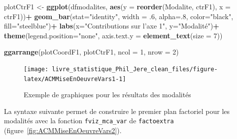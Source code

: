 \documentclass[
  11pt,
  french,
]{book}
\makeatletter
\newenvironment{Shaded}{\begin{snugshade}}{\end{snugshade}}
\newcommand{\CommentTok}[1]{\textcolor[rgb]{0.56,0.35,0.01}{\textit{#1}}}
\newcommand{\DataTypeTok}[1]{\textcolor[rgb]{0.13,0.29,0.53}{#1}}
\newcommand{\DecValTok}[1]{\textcolor[rgb]{0.00,0.00,0.81}{#1}}
\newcommand{\FloatTok}[1]{\textcolor[rgb]{0.00,0.00,0.81}{#1}}
\newcommand{\KeywordTok}[1]{\textcolor[rgb]{0.13,0.29,0.53}{\textbf{#1}}}
\newcommand{\NormalTok}[1]{#1}
\newcommand{\OperatorTok}[1]{\textcolor[rgb]{0.81,0.36,0.00}{\textbf{#1}}}
\newcommand{\OtherTok}[1]{\textcolor[rgb]{0.56,0.35,0.01}{#1}}
\newcommand{\StringTok}[1]{\textcolor[rgb]{0.31,0.60,0.02}{#1}}
\newenvironment{kframe}{%
\medskip{}
\setlength{\fboxsep}{.8em}
 \def\at@end@of@kframe{}%
 \ifinner\ifhmode%
  \def\at@end@of@kframe{\end{minipage}}%
  \begin{minipage}{\columnwidth}%
 \fi\fi%
 \def\FrameCommand##1{\hskip\@totalleftmargin \hskip-\fboxsep
 \colorbox{shadecolor}{##1}\hskip-\fboxsep
     \hskip-\linewidth \hskip-\@totalleftmargin \hskip\columnwidth}%
 \MakeFramed {\advance\hsize-\width
   \@totalleftmargin\z@ \linewidth\hsize
   \@setminipage}}%
 {\par\unskip\endMakeFramed%
 \at@end@of@kframe}
\renewenvironment{Shaded}{\begin{kframe}}{\end{kframe}}
\makeatother
\begin{document}
\begin{Shaded}
\begin{Highlighting}[]
\NormalTok{plotCtrF1 <-}\StringTok{ }\KeywordTok{ggplot}\NormalTok{(dfmodalites, }\KeywordTok{aes}\NormalTok{(}\DataTypeTok{y =} \KeywordTok{reorder}\NormalTok{(Modalite, ctrF1), }\DataTypeTok{x =}\NormalTok{ ctrF1))}\OperatorTok{+}
\StringTok{  }\KeywordTok{geom_bar}\NormalTok{(}\DataTypeTok{stat=}\StringTok{"identity"}\NormalTok{, }\DataTypeTok{width =} \FloatTok{.6}\NormalTok{, }\DataTypeTok{alpha=}\NormalTok{.}\DecValTok{8}\NormalTok{, }\DataTypeTok{color=}\StringTok{"black"}\NormalTok{, }\DataTypeTok{fill=}\StringTok{"steelblue"}\NormalTok{)}\OperatorTok{+}
\StringTok{  }\KeywordTok{labs}\NormalTok{(}\DataTypeTok{x=}\StringTok{"Contributions sur l'axe 1"}\NormalTok{, }\DataTypeTok{y=}\StringTok{"Modalité"}\NormalTok{)}\OperatorTok{+}
\StringTok{  }\KeywordTok{theme}\NormalTok{(}\DataTypeTok{legend.position=}\StringTok{"none"}\NormalTok{, }\DataTypeTok{axis.text.y =} \KeywordTok{element_text}\NormalTok{(}\DataTypeTok{size =} \DecValTok{7}\NormalTok{))}

\KeywordTok{ggarrange}\NormalTok{(plotCoordF1, plotCtrF1, }\DataTypeTok{ncol =} \DecValTok{1}\NormalTok{, }\DataTypeTok{nrow =} \DecValTok{2}\NormalTok{)}
\end{Highlighting}
\end{Shaded}

\begin{figure}

{\centering \texttt{[image: livre\_statistique\_Phil\_Jere\_clean\_files/figure-latex/ACMMiseEnOeuvreVars1-1]} 

}

\caption{Exemple de graphiques pour les résultats des modalités}\label{fig:ACMMiseEnOeuvreVars1}
\end{figure}

La syntaxe suivante permet de construire le premier plan factoriel pour les modalités avec la fonction \texttt{fviz\_mca\_var} de \texttt{factoextra} (figure~\ref{fig:ACMMiseEnOeuvreVars2}).

\begin{Shaded}
\end{Shaded}
\end{document}
